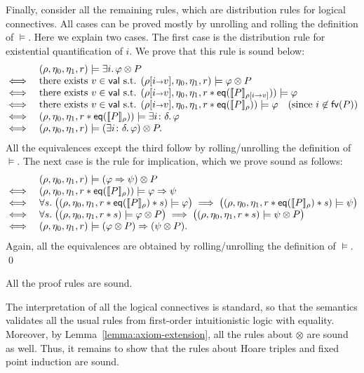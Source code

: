 \documentclass{LMCS}
\newcommand{\val}{\mathsf{val}}
\newcommand{\FV}{\mathsf{fv}}
\newcommand{\bind}{{\scriptstyle\relax\rightarrow}}
\newcommand{\ff}[1]{[\![#1]\!]}
\newcommand{\EQ}{\mathsf{eq}}
\begin{document}
Finally, consider all the remaining rules, which
are distribution rules for logical connectives. All
cases can be proved
mostly by unrolling and rolling the definition of
$\models$. Here we explain two
cases. The first case is the distribution rule for 
existential quantification of $i$. We prove that this rule is 
sound below:
$$
\begin{array}{@{}ll@{}}
&
(\rho,\eta_0,\eta_1,r) \models \exists i.\,\varphi\otimes P
\\
\iff 
&
\mbox{there exists $v \in \val$ s.t. }
(\rho[i\bind v],\eta_0,\eta_1,r) \models \varphi\otimes P
\\
\iff 
&
\mbox{there exists $v \in \val$ s.t. }
(\rho[i\bind v],\eta_0,\eta_1,r*\EQ(\ff{P}_{\rho[i\bind v]})) 
\models \varphi
\\
\iff 
&
\mbox{there exists $v \in \val$ s.t. }
(\rho[i\bind v],\eta_0,\eta_1,r*\EQ(\ff{P}_{\rho}))
\models \varphi
\quad
\hfill
(\mbox{since $i \not\in \FV(P)$})
\\
\iff 
&
(\rho,\eta_0,\eta_1,r*\EQ(\ff{P}_{\rho}))
\models \exists i\colon \delta.\, \varphi
\\
\iff 
&
(\rho,\eta_0,\eta_1,r)
\models (\exists i\colon \delta.\, \varphi) \otimes P.
\end{array}
$$
All the equivalences except the third follow 
by rolling/unrolling the definition of $\models$.
The next case is the rule for implication,
which we prove sound as follows:
$$
\begin{array}{@{}ll@{}}
& (\rho,\eta_0,\eta_1,r) \models (\varphi \Rightarrow \psi) \otimes P
\\
\iff
& (\rho,\eta_0,\eta_1,r*\EQ(\ff{P}_\rho)) 
  \models \varphi \Rightarrow \psi
\\
\iff
& \forall s.\;
  \bigl((\rho,\eta_0,\eta_1,r*\EQ(\ff{P}_\rho)*s) \models \varphi\bigr)
  \implies
  \bigl((\rho,\eta_0,\eta_1,r*\EQ(\ff{P}_\rho)*s) \models \psi\bigr)
\\
\iff
& \forall s.\;
 \bigl((\rho,\eta_0,\eta_1,r*s) \models \varphi\otimes P\bigr)
 \implies
  \bigl((\rho,\eta_0,\eta_1,r*s) \models \psi\otimes P\bigr)
\\
\iff
& (\rho,\eta_0,\eta_1,r) \models 
  (\varphi\otimes P) \Rightarrow (\psi\otimes P).
\end{array}
$$
Again, all the equivalences are obtained by rolling/unrolling 
the definition of $\models$.
\qed

\begin{thm}\label{thm:soundness}
  All the proof rules are sound.
\end{thm}
\proof
The interpretation of all the logical connectives
is standard, so that the semantics validates
all the usual rules from first-order intuitionistic logic with 
equality. Moreover, by Lemma~\ref{lemma:axiom-extension}, 
all the rules about $\otimes$ are sound as well. Thus, 
it remains to show that the rules about Hoare triples
and fixed point induction are sound.
\end{document}
